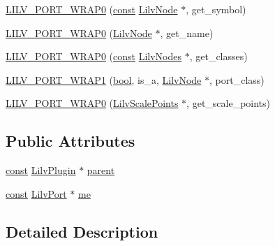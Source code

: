 \begin{DoxyCompactItemize}
\item 
\hyperlink{struct_lilv_1_1_port_accc621b0729e67a5bb2503e4fd7d45b6}{L\+I\+L\+V\+\_\+\+P\+O\+R\+T\+\_\+\+W\+R\+A\+P0} (\hyperlink{getopt1_8c_a2c212835823e3c54a8ab6d95c652660e}{const} \hyperlink{lilv_8h_ae183dca3dca5368d34dbd863a405437b}{Lilv\+Node} $\ast$, get\+\_\+symbol)
\item 
\hyperlink{struct_lilv_1_1_port_a6fe4cc19a3e2c74818859cf7d63767ae}{L\+I\+L\+V\+\_\+\+P\+O\+R\+T\+\_\+\+W\+R\+A\+P0} (\hyperlink{lilv_8h_ae183dca3dca5368d34dbd863a405437b}{Lilv\+Node} $\ast$, get\+\_\+name)
\item 
\hyperlink{struct_lilv_1_1_port_a3cebebc9532954f5aa814ebec0ddd3fc}{L\+I\+L\+V\+\_\+\+P\+O\+R\+T\+\_\+\+W\+R\+A\+P0} (\hyperlink{getopt1_8c_a2c212835823e3c54a8ab6d95c652660e}{const} \hyperlink{lilv_8h_a256c2c4443307f320de24bb31198df83}{Lilv\+Nodes} $\ast$, get\+\_\+classes)
\item 
\hyperlink{struct_lilv_1_1_port_ae229c9bc252ed0ddac96590afe17ec29}{L\+I\+L\+V\+\_\+\+P\+O\+R\+T\+\_\+\+W\+R\+A\+P1} (\hyperlink{mac_2config_2i386_2lib-src_2libsoxr_2soxr-config_8h_abb452686968e48b67397da5f97445f5b}{bool}, is\+\_\+a, \hyperlink{lilv_8h_ae183dca3dca5368d34dbd863a405437b}{Lilv\+Node} $\ast$, port\+\_\+class)
\item 
\hyperlink{struct_lilv_1_1_port_a43ef8603593d589693848fbfc7bcb719}{L\+I\+L\+V\+\_\+\+P\+O\+R\+T\+\_\+\+W\+R\+A\+P0} (\hyperlink{lilv_8h_a059c9ec61f4497a433d3e6030e9a3f37}{Lilv\+Scale\+Points} $\ast$, get\+\_\+scale\+\_\+points)
\end{DoxyCompactItemize}
\subsection*{Public Attributes}
\begin{DoxyCompactItemize}
\item 
\hyperlink{getopt1_8c_a2c212835823e3c54a8ab6d95c652660e}{const} \hyperlink{lilv_8h_a94e36303167a78a0c392f881136b461b}{Lilv\+Plugin} $\ast$ \hyperlink{struct_lilv_1_1_port_ada13694330de2f1388615194bde4e910}{parent}
\item 
\hyperlink{getopt1_8c_a2c212835823e3c54a8ab6d95c652660e}{const} \hyperlink{lilv_8h_a772dad64b72690372c1f78314012bda5}{Lilv\+Port} $\ast$ \hyperlink{struct_lilv_1_1_port_a7f1c15008e7c9bbd944ee463222dc802}{me}
\end{DoxyCompactItemize}


\subsection{Detailed Description}


